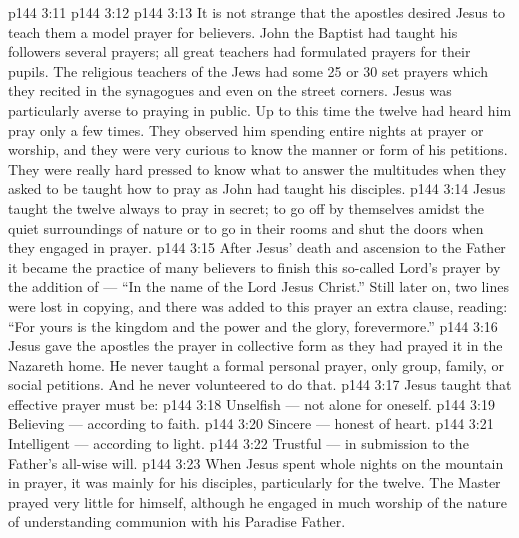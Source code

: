 \vs p144 3:11 
\vs p144 3:12 \hsetoff {}
\vspace*{1ex}
\vs p144 3:13 \pc It is not strange that the apostles desired Jesus to teach them a model prayer for believers. John the Baptist had taught his followers several prayers; all great teachers had formulated prayers for their pupils. The religious teachers of the Jews had some 25 or 30 set prayers which they recited in the synagogues and even on the street corners. Jesus was particularly averse to praying in public. Up to this time the twelve had heard him pray only a few times. They observed him spending entire nights at prayer or worship, and they were very curious to know the manner or form of his petitions. They were really hard pressed to know what to answer the multitudes when they asked to be taught how to pray as John had taught his disciples.
\vs p144 3:14 Jesus taught the twelve always to pray in secret; to go off by themselves amidst the quiet surroundings of nature or to go in their rooms and shut the doors when they engaged in prayer.
\vs p144 3:15 After Jesus’ death and ascension to the Father it became the practice of many believers to finish this so\hyp{}called Lord’s prayer by the addition of --- “In the name of the Lord Jesus Christ.” Still later on, two lines were lost in copying, and there was added to this prayer an extra clause, reading: “For yours is the kingdom and the power and the glory, forevermore.”
\vs p144 3:16 Jesus gave the apostles the prayer in collective form as they had prayed it in the Nazareth home. He never taught a formal personal prayer, only group, family, or social petitions. And he never volunteered to do that.
\vs p144 3:17 Jesus taught that effective prayer must be:
\vs p144 3:18 \bibnobreakspace Unselfish --- not alone for oneself.
\vs p144 3:19 \bibnobreakspace Believing --- according to faith.
\vs p144 3:20 \bibnobreakspace Sincere --- honest of heart.
\vs p144 3:21 \bibnobreakspace Intelligent --- according to light.
\vs p144 3:22 \bibnobreakspace Trustful --- in submission to the Father’s all\hyp{}wise will.
\vs p144 3:23 \pc When Jesus spent whole nights on the mountain in prayer, it was mainly for his disciples, particularly for the twelve. The Master prayed very little for himself, although he engaged in much worship of the nature of understanding communion with his Paradise Father.
